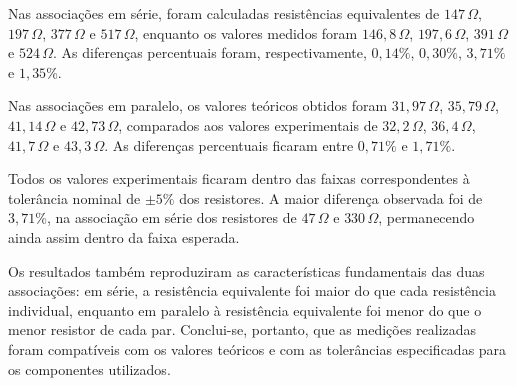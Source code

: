 \documentclass[a4paper,12pt]{article}
\begin{document}
Nas associações em série, foram calculadas resistências equivalentes de
$147\,\Omega$, $197\,\Omega$, $377\,\Omega$ e $517\,\Omega$, enquanto os
valores medidos foram $146{,}8\,\Omega$, $197{,}6\,\Omega$, $391\,\Omega$ e
$524\,\Omega$. As diferenças percentuais foram, respectivamente,
$0{,}14\%$, $0{,}30\%$, $3{,}71\%$ e $1{,}35\%$.

Nas associações em paralelo, os valores teóricos obtidos foram
$31{,}97\,\Omega$, $35{,}79\,\Omega$, $41{,}14\,\Omega$ e
$42{,}73\,\Omega$, comparados aos valores experimentais de
$32{,}2\,\Omega$, $36{,}4\,\Omega$, $41{,}7\,\Omega$ e
$43{,}3\,\Omega$. As diferenças percentuais ficaram entre
$0{,}71\%$ e $1{,}71\%$.

Todos os valores experimentais ficaram dentro das faixas correspondentes à
tolerância nominal de $\pm5\%$ dos resistores. A maior diferença observada foi
de $3{,}71\%$, na associação em série dos resistores de $47\,\Omega$ e
$330\,\Omega$, permanecendo ainda assim dentro da faixa esperada.

Os resultados também reproduziram as características fundamentais das duas
associações: em série, a resistência equivalente foi maior do que cada
resistência individual, enquanto em paralelo à resistência equivalente foi
menor do que o menor resistor de cada par. Conclui-se, portanto, que as
medições realizadas foram compatíveis com os valores teóricos e com as
tolerâncias especificadas para os componentes utilizados.

\newpage
\end{document}
